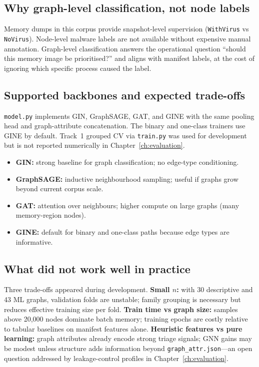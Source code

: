 \subsection{Why graph-level classification, not node labels}

Memory dumps in this corpus provide snapshot-level supervision (\texttt{WithVirus} vs \texttt{NoVirus}). Node-level malware labels are not available without expensive manual annotation. Graph-level classification answers the operational question ``should this memory image be prioritised?'' and aligns with manifest labels, at the cost of ignoring which specific process caused the label.

\subsection{Supported backbones and expected trade-offs}

\texttt{model.py} implements GIN, GraphSAGE, GAT, and GINE with the same pooling head and graph-attribute concatenation. The binary and one-class trainers use GINE by default. Track~1 grouped CV via \texttt{train.py} was used for development but is not reported numerically in Chapter~\ref{ch:evaluation}.

\begin{itemize}
\item \textbf{GIN:} strong baseline for graph classification; no edge-type conditioning.
\item \textbf{GraphSAGE:} inductive neighbourhood sampling; useful if graphs grow beyond current corpus scale.
\item \textbf{GAT:} attention over neighbours; higher compute on large graphs (many memory-region nodes).
\item \textbf{GINE:} default for binary and one-class paths because edge types are informative.
\end{itemize}

\subsection{What did not work well in practice}

Three trade-offs appeared during development. \textbf{Small $n$:} with 30 descriptive and 43 ML graphs, validation folds are unstable; family grouping is necessary but reduces effective training size per fold. \textbf{Train time vs graph size:} samples above 20,000 nodes dominate batch memory; training epochs are costly relative to tabular baselines on manifest features alone. \textbf{Heuristic features vs pure learning:} graph attributes already encode strong triage signals; GNN gains may be modest unless structure adds information beyond \texttt{graph\_attr.json}---an open question addressed by leakage-control profiles in Chapter~\ref{ch:evaluation}.

